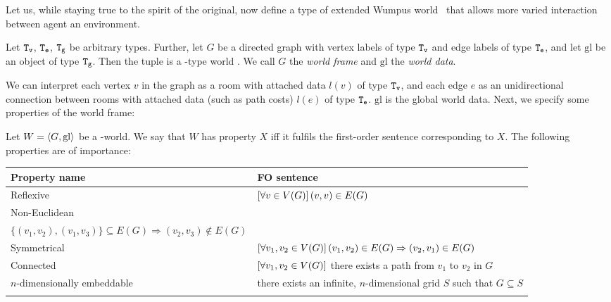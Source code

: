 Let us, while staying true to the spirit of the original, now define a type of extended Wumpus world \wext\ that allows more varied interaction between agent an environment.

\begin{definition}\label{def:wext}
	Let $\mathtt{T_v}$, $\mathtt{T_e}$, $\mathtt{T_g}$ be arbitrary types. Further, let $G$ be a directed graph with vertex labels of type $\mathtt{T_v}$ and edge labels of type $\mathtt{T_e}$, and let $\mathrm{gl}$ be an object of type $\mathtt{T_g}$. Then the tuple  is a \wext-type world . We call $G$ the {\em world frame} and $\mathrm{gl}$ the {\em world data}.
\end{definition}

We can interpret each vertex $v$ in the graph as a room with attached data $l(v)$ of type $\mathtt{T_v}$, and each edge $e$ as an unidirectional connection between rooms with attached data (such as path costs) $l(e)$ of type $\mathtt{T_e}$. $\mathrm{gl}$ is the global world data. Next, we specify some properties of the world frame:

\begin{definition}
	Let $W = \langle G,\mathrm{gl} \rangle$ be a \wext-world. We say that $W$ has property $X$ iff it fulfils the first-order sentence corresponding to $X$. The following properties are of importance:
	
	

	\begin{center}
		\begin{tabular}[b]{l l}
		\toprule
		\textbf{Property name} & \textbf{FO sentence}\\
		\midrule\addlinespace[0.7em]
		Reflexive & $\left[\forall v \in V(G) \right] (v,v) \in E(G)$\\ \addlinespace[0.7em]
		Non-Euclidean &
		\begin{minipage}[t]{0.65\textwidth}
			$\allQ{\textit{ pairwise distinct } v_1,v_2,v_3 \in V(G)}$\\$\{(v_1,v_2),(v_1,v_3)\} \subseteq E(G) \Rightarrow (v_2,v_3) \notin E(G)$
		\end{minipage}\\ \addlinespace[0.7em]
		Symmetrical & $\left[\forall v_1,v_2 \in V(G) \right] (v_1,v_2) \in E(G) \Rightarrow (v_2,v_1) \in E(G)$\\ \addlinespace[0.7em]
		Connected & $\left[\forall v_1,v_2 \in V(G) \right]$ there exists a path from $v_1$ to $v_2$ in $G$\\ \addlinespace[0.7em]
		
		$n$-dimensionally embeddable &
		there exists an infinite, $n$-dimensional grid $S$ such that $G \subseteq S$\footnotemark
		
		\\ \addlinespace[0.5em]
		\bottomrule
		
		\end{tabular}
	\end{center}
\end{definition}

